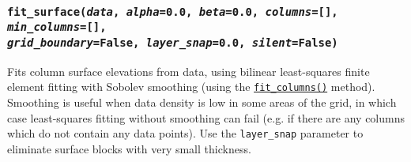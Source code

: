 \begin{snugshade}\subsubsection{\texttt{fit\_surface(\emph{data}, \emph{alpha}=0.0, \emph{beta}=0.0, \emph{columns}=[], \emph{min\_columns}=[], \\
    \emph{grid\_boundary}=False, \emph{layer\_snap}=0.0, \emph{silent}=False)}}\end{snugshade}
\label{sec:mulgrid:fit_surface}

Fits column surface elevations from data, using bilinear least-squares finite element fitting with Sobolev smoothing (using the \hyperref[sec:mulgrid:fit_columns]{\texttt{fit\_columns()}} method).  Smoothing is useful when data density is low in some areas of the grid, in which case least-squares fitting without smoothing can fail (e.g. if there are any columns which do not contain any data points). Use the \texttt{layer\_snap} parameter to eliminate surface blocks with very small thickness.

